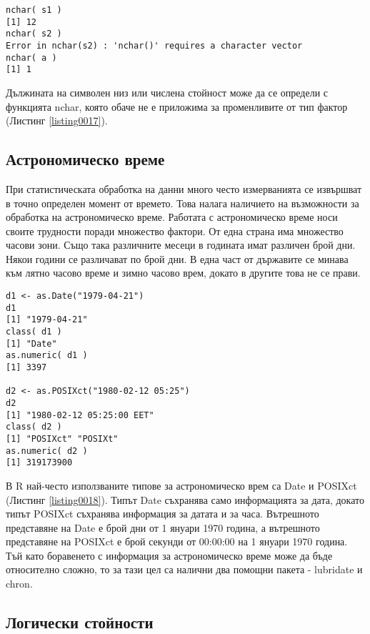 \begin{lstlisting}[caption=Дължина на символен низ или числена стойност, label=listing0017]
nchar( s1 )
[1] 12
nchar( s2 )
Error in nchar(s2) : 'nchar()' requires a character vector
nchar( a )
[1] 1
\end{lstlisting}

Дължината на символен низ или числена стойност може да се определи с функцията nchar, която обаче не е приложима за променливите от тип фактор (Листинг \ref{listing0017}).

\subsection{Астрономическо време}

При статистическата обработка на данни много често измерванията се извършват в точно определен момент от времето. Това налага наличието на възможности за обработка на астрономическо време. Работата с астрономическо време носи своите трудности поради множество фактори. От една страна има множество часови зони. Също така различните месеци в годината имат различен брой дни. Някои години се различават по брой дни. В една част от държавите се минава към лятно часово време и зимно часово врем, докато в другите това не се прави. 

\begin{lstlisting}[caption=Типове данни за време, label=listing0018]
d1 <- as.Date("1979-04-21")
d1
[1] "1979-04-21"
class( d1 )
[1] "Date"
as.numeric( d1 )
[1] 3397

d2 <- as.POSIXct("1980-02-12 05:25")
d2
[1] "1980-02-12 05:25:00 EET"
class( d2 )
[1] "POSIXct" "POSIXt" 
as.numeric( d2 )
[1] 319173900
\end{lstlisting}

В R най-често използваните типове за астрономическо врем са Date и POSIXct (Листинг \ref{listing0018}). Типът Date съхранява само информацията за дата, докато типът POSIXct съхранява информация за датата и за часа. Вътрешното представяне на Date е брой дни от 1 януари 1970 година, а вътрешното представяне на POSIXct е брой секунди от 00:00:00 на 1 януари 1970 година. Тъй като боравенето с информация за астрономическо време може да бъде относително сложно, то за тази цел са налични два помощни пакета - lubridate и chron. 

\subsection{Логически стойности}


